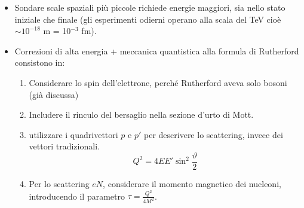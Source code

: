 \noindent
\begin{minipage}[t]{0.48\textwidth}
    \begin{itemize}
        \item Sondare scale spaziali più piccole richiede energie maggiori, sia nello stato iniziale che finale (gli esperimenti odierni operano alla scala del TeV cioè  
        $\sim10^{-18}$ m = 10$^{-3}$ fm). 
        \item Correzioni di alta energia + meccanica quantistica alla formula di Rutherford consistono in:
        \begin{enumerate}
            \item Considerare lo spin dell'elettrone, perché Rutherford aveva solo bosoni (già discussa)
            \item Includere il rinculo del bersaglio nella sezione d'urto di Mott.
            \item utilizzare i quadrivettori $p$ e $p'$ per descrivere lo scattering, invece dei vettori tradizionali.
            \begin{equation*}
            Q^2=4EE'\sin^2\frac\vartheta2
            \end{equation*}
            \item Per lo scattering $eN$, considerare il momento magnetico dei nucleoni, introducendo il parametro $\tau =\frac{ Q^2}{4M^2}$.
        \end{enumerate}
    \end{itemize}
\end{minipage}
\hfill
